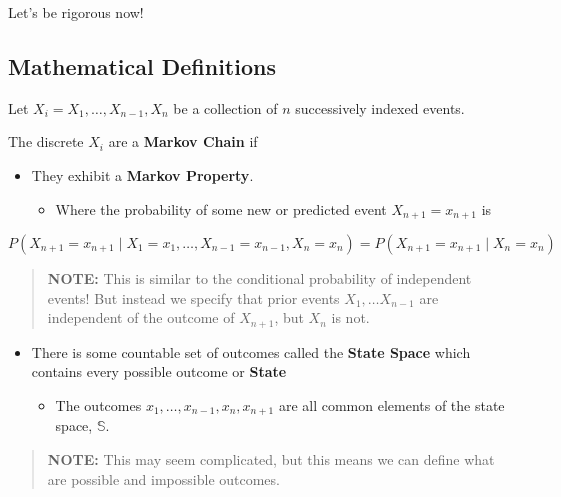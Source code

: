 \documentclass[
]{book}
\providecommand{\tightlist}{%
  \setlength{\itemsep}{0pt}\setlength{\parskip}{0pt}}
\begin{document}
Let's be rigorous now!

\hypertarget{mathematical-definitions}{%
\subsection*{Mathematical Definitions}\label{mathematical-definitions}}

Let \(X_i = X_1, \dots, X_{n-1}, X_n\) be a collection of \(n\) successively indexed events.

The discrete \(X_i\) are a \textbf{Markov Chain} if

\begin{itemize}
\tightlist
\item
  They exhibit a \textbf{Markov Property}.

  \begin{itemize}
  \tightlist
  \item
    Where the probability of some new or predicted event \(X_{n+1}=x_{n+1}\) is
  \end{itemize}
\end{itemize}

\[P(X_{n+1} = x_{n+1} \mid X_1 = x_1, \dots,  X_{n-1}= x_{n-1}, X_n= x_{n}) = P(X_{n+1} = x_{n+1} \mid X_n = x_n)\]

\begin{quote}
\textbf{NOTE:} This is similar to the conditional probability of independent events! But instead we specify that prior events \(X_1,\dots X_{n-1}\) are independent of the outcome of \(X_{n+1}\), but \(X_{n}\) is not.
\end{quote}

\hfill\break

\begin{itemize}
\tightlist
\item
  There is some countable set of outcomes called the \textbf{State Space} which contains every possible outcome or \textbf{State}

  \begin{itemize}
  \tightlist
  \item
    The outcomes \(x_1, \dots, x_{n-1}, x_{n}, x_{n+1}\) are all common elements of the state space, \(\mathbb{S}\).
  \end{itemize}
\end{itemize}

\begin{quote}
\textbf{NOTE:} This may seem complicated, but this means we can define what are possible and impossible outcomes.
\end{quote}
\end{document}
